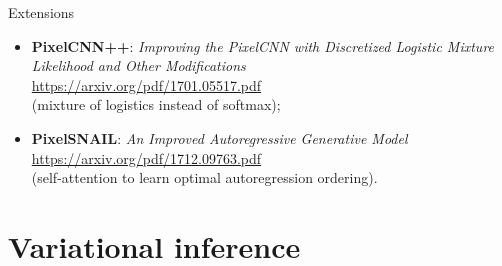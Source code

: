 \begin{frame}{Extensions}
\begin{itemize}
	\item \textbf{PixelCNN++}: \textit{Improving the PixelCNN with Discretized Logistic Mixture Likelihood and Other Modifications} \\
	\href{https://arxiv.org/pdf/1701.05517.pdf}{https://arxiv.org/pdf/1701.05517.pdf} \\
	(mixture of logistics instead of softmax);
	\item \textbf{PixelSNAIL}: \textit{An Improved Autoregressive Generative Model} \\
	\href{https://arxiv.org/pdf/1712.09763.pdf}{https://arxiv.org/pdf/1712.09763.pdf} \\
	(self-attention to learn optimal autoregression ordering).
\end{itemize}
\end{frame}
\section{Variational inference}

